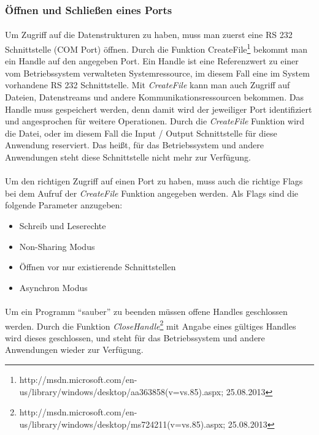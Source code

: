\subsubsection{Öffnen und Schließen eines Ports}
\paragraph{}
Um Zugriff auf die Datenstrukturen zu haben, muss man zuerst eine RS 232 Schnittstelle (COM Port) öffnen. Durch die Funktion CreateFile\footnote{http://msdn.microsoft.com/en-us/library/windows/desktop/aa363858(v=vs.85).aspx; 25.08.2013} bekommt man ein Handle auf den angegeben Port. Ein Handle ist eine Referenzwert zu einer vom Betriebssystem verwalteten Systemressource, im diesem Fall eine im System vorhandene RS 232 Schnittstelle. Mit \textit{CreateFile} kann man auch Zugriff auf Dateien, Datenstreams und andere Kommunikationsressourcen bekommen. Das Handle muss gespeichert werden, denn damit wird der jeweiliger Port identifiziert und angesprochen für weitere Operationen. Durch die \textit{CreateFile} Funktion wird die Datei, oder im diesem Fall die Input / Output Schnittstelle für diese Anwendung reserviert. Das heißt, für das Betriebssystem und andere Anwendungen steht diese Schnittstelle nicht mehr zur Verfügung.

\paragraph{}
Um den richtigen Zugriff auf einen Port zu haben, muss auch die richtige Flags bei dem Aufruf der \textit{CreateFile} Funktion angegeben werden. Als Flags sind die folgende Parameter anzugeben:
\begin{itemize}
\item Schreib und Leserechte
\item Non-Sharing Modus
\item Öffnen vor nur existierende Schnittstellen
\item Asynchron Modus
\end{itemize}


\paragraph{}
Um ein Programm "`sauber"' zu beenden müssen offene Handles geschlossen werden. Durch die Funktion \textit{CloseHandle}\footnote{http://msdn.microsoft.com/en-us/library/windows/desktop/ms724211(v=vs.85).aspx; 25.08.2013} mit Angabe eines gültiges Handles wird dieses geschlossen, und steht für das Betriebssystem und andere Anwendungen wieder zur Verfügung.


